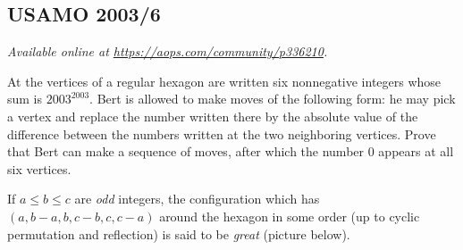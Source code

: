 \documentclass[11pt]{scrartcl}
\begin{document}
\subsection{USAMO 2003/6}
\textsl{Available online at \url{https://aops.com/community/p336210}.}
\begin{mdframed}[style=mdpurplebox,frametitle={Problem statement}]
At the vertices of a regular hexagon are written six nonnegative integers
whose sum is $2003^{2003}$.
Bert is allowed to make moves of the following form:
he may pick a vertex and replace the number written
there by the absolute value of the difference between the numbers
written at the two neighboring vertices.
Prove that Bert can make a sequence of moves,
after which the number $0$ appears at all six vertices.
\end{mdframed}
If $a \le b \le c$ are \emph{odd} integers,
the configuration which has $(a,b-a,b,c-b,c,c-a)$ around the hexagon
in some order (up to cyclic permutation and reflection)
is said to be \emph{great} (picture below).
\end{document}
